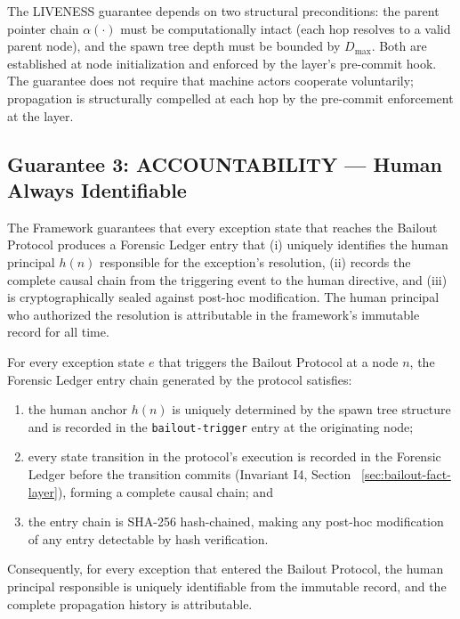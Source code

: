 The LIVENESS guarantee depends on two structural preconditions: the parent
pointer chain $\alpha(\cdot)$ must be computationally intact (each hop resolves
to a valid parent node), and the spawn tree depth must be bounded by $D_{\max}$.
Both are established at node initialization and enforced by the \fact{} layer's
pre-commit hook.  The guarantee does not require that machine actors cooperate
voluntarily; propagation is structurally compelled at each hop by the
pre-commit enforcement at the \fact{} layer.

\subsection{Guarantee 3: ACCOUNTABILITY --- Human Always Identifiable}
\label{sec:accountability}

\begin{definition}
\label{def:accountability}
The \bxthree{} Framework guarantees that every exception state that reaches
the Bailout Protocol produces a Forensic Ledger entry that (i) uniquely
identifies the human principal $h(n)$ responsible for the exception's resolution,
(ii) records the complete causal chain from the triggering event to the human
directive, and (iii) is cryptographically sealed against post-hoc modification.
The human principal who authorized the resolution is attributable in the
framework's immutable record for all time.
\end{definition}

\begin{maintheorem}[ACCOUNTABILITY]
\label{th:accountability}
For every exception state $e$ that triggers the Bailout Protocol at a node
$n$, the Forensic Ledger entry chain generated by the protocol satisfies:
\begin{enumerate}
\item[(i)] the human anchor $h(n)$ is uniquely determined by the spawn tree
structure and is recorded in the \texttt{bailout-trigger} entry at the
originating node;
\item[(ii)] every state transition in the protocol's execution is recorded
in the Forensic Ledger before the transition commits (Invariant I4, Section~
\ref{sec:bailout-fact-layer}), forming a complete causal chain; and
\item[(iii)] the entry chain is SHA-256 hash-chained, making any post-hoc
modification of any entry detectable by hash verification.
\end{enumerate}
Consequently, for every exception that entered the Bailout Protocol, the human
principal responsible is uniquely identifiable from the immutable record,
and the complete propagation history is attributable.
\end{maintheorem}


